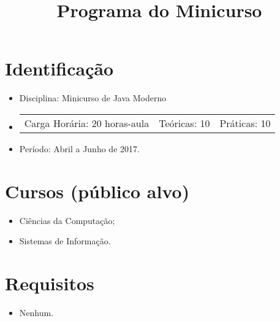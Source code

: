 \documentclass{article}
\title{Programa do Minicurso}
\author{}
\date{}
\begin{document}
\maketitle

\section{Identificação}

\begin{itemize}
    \item[] Disciplina: Minicurso de Java Moderno
    \item[]
        \hspace{-1em}
        \begin{tabular}{ccc}
            Carga Horária: 20 horas-aula&
            Teóricas: 10&
            Práticas: 10
        \end{tabular}
    \item[] Período: Abril a Junho de 2017.
\end{itemize}

\section{Cursos (público alvo)}
\begin{itemize}
    \item[] Ciências da Computação;
    \item[] Sistemas de Informação.
\end{itemize}

\section{Requisitos}
\begin{itemize}
    \item[] Nenhum.
\end{itemize}
\end{document}
